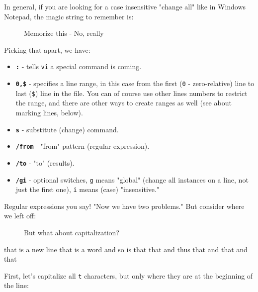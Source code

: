 \documentclass[10pt,american,]{book}
\newenvironment{Shaded}{\begin{snugshade}}{\end{snugshade}}
\newcommand{\KeywordTok}[1]{\textcolor[rgb]{0.13,0.29,0.53}{\textbf{{#1}}}}
\newcommand{\OtherTok}[1]{\textcolor[rgb]{0.56,0.35,0.01}{{#1}}}
\newcommand{\NormalTok}[1]{{#1}}
\numberwithin{figure}{chapter}
\DeclareRobustCommand{\drcap}[1]{\begin{figure}[H]\caption{#1}\end{figure}}
\renewcommand{\KeywordTok}[1]{{#1}}
\renewcommand{\OtherTok}[1]{{#1}}
\renewcommand{\NormalTok}[1]{{#1}}
\begin{document}
In general, if you are looking for a case insensitive "change all" like
in Windows Notepad, the magic string to remember is:

\drcap{Memorize this - No, really}

\begin{Shaded}
\end{Shaded}

Picking that apart, we have:

\begin{itemize}
\item
  \textbf{\texttt{:}} - tells \texttt{vi} a special command is coming.
\item
  \textbf{\texttt{0,\$}} - specifies a line range, in this case from the
  first (\texttt{0} - zero-relative) line to last (\texttt{\$}) line in
  the file. You can of course use other lines numbers to restrict the
  range, and there are other ways to create ranges as well (see about
  marking lines, below).
\item
  \textbf{\texttt{s}} - substitute (change) command.
\item
  \textbf{\texttt{/from}} - "from" pattern (regular expression).
\item
  \textbf{\texttt{/to}} - "to" (results).
\item
  \textbf{\texttt{/gi}} - optional switches, \texttt{g} means "global"
  (change all instances on a line, not just the first one), \texttt{i}
  means (case) "insensitive."
\end{itemize}

Regular expressions you say! "Now we have two problems." But consider
where we left off: 

\drcap{But what about capitalization?}

\begin{Shaded}
\begin{Highlighting}[]
\KeywordTok{that} \NormalTok{is a new line}
\KeywordTok{that} \NormalTok{is a word}
\KeywordTok{and} \NormalTok{so is that}
\KeywordTok{that} \NormalTok{and thus}
\KeywordTok{that} \NormalTok{and that and that}
\end{Highlighting}
\end{Shaded}

First, let's capitalize all \texttt{t} characters, but only where they
are at the beginning of the line:
\end{document}
